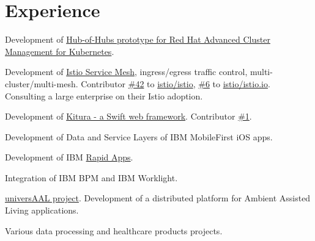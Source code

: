 \documentclass[]{deedy-resume}
\begin{document}
\hfill
\begin{minipage}[t]{0.66\textwidth}


\section{Experience}

\vspace{\topsep} %
\begin{tightemize}
\item Development of \href{https://github.com/stolostron/hub-of-hubs}{Hub-of-Hubs prototype for Red Hat Advanced Cluster Management for Kubernetes}.
\item Development of \href{https://istio.io}{Istio Service Mesh}, ingress/egress traffic control, multi-cluster/multi-mesh.
Contributor \href{https://github.com/istio/istio/graphs/contributors}{\#42} to \href{https://github.com/istio/istio}{istio/istio}, \href{https://github.com/istio/istio.io/graphs/contributors}{\#6} to \href{https://github.com/istio/istio.io}{istio/istio.io}. Consulting a large enterprise on their Istio adoption.
\item Development of \href{https://github.com/Kitura/Kitura}{Kitura - a Swift web framework}. Contributor \href{https://github.com/IBM-Swift/Kitura/graphs/contributors}{\#1}.
\item Development of Data and Service Layers of IBM MobileFirst iOS apps.
\item Development of IBM \href{https://www.programmableweb.com/news/ibm-previews-rapidapps-builder-development-tools/2014/05/02}{Rapid Apps}.
\item Integration of IBM BPM and IBM Worklight.
\end{tightemize}
\sectionsep

\vspace{\topsep} %
\begin{tightemize}
\item \href{https://cordis.europa.eu/project/id/247950}{universAAL project}. Development of a distributed platform for Ambient Assisted Living applications.
\item Various data processing and healthcare products projects.
\end{tightemize}
\sectionsep


\end{minipage}
\end{document}
